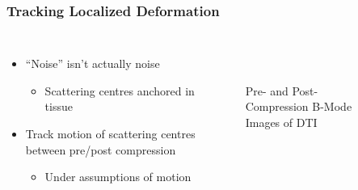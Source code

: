\documentclass{beamer}
\begin{document}
		\begin{frame}
			\frametitle{Tracking Localized Deformation}
			\begin{columns}[c]
					\begin{itemize}
						\item ``Noise'' isn't actually noise
						\begin{itemize}
							\item Scattering centres anchored in tissue
						\end{itemize}
						\item Track motion of scattering centres between pre/post compression
						\begin{itemize}
							\item Under assumptions of motion
						\end{itemize}
					\end{itemize}

					\begin{figure}
						\centering
						~
						\caption{Pre- and Post- Compression B-Mode Images of DTI}
					\end{figure}
			\end{columns}
		\end{frame}
\end{document}
